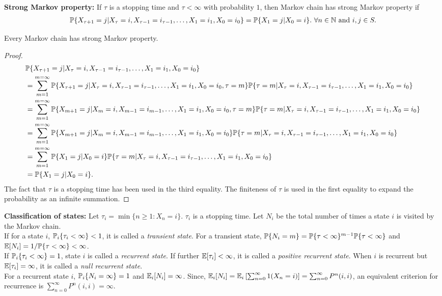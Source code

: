 \documentclass[all-lectures.tex]{subfiles}
\begin{document}
\indent \textbf{Strong Markov property:} If $\tau$ is a stopping time and $\tau < \infty$ with probability $1$, then Markov chain has strong Markov property if
\begin{align*}
\P\{X_{\tau+1} = j|X_{\tau} = i, X_{\tau-1} = i_{\tau-1},\dots,X_1 = i_1,X_0 = i_0\} = \P\{X_1 = j|X_{0} = i\}. \ \forall n \in \mathbb{N} \text{ and }i,j \in S.
\end{align*}
\begin{thm}
Every Markov chain has strong Markov property.
\begin{proof}
\begin{align*}
&\P\{X_{{\tau+1}} = j|X_{\tau} = i, X_{\tau-1} = i_{\tau-1},\dots,X_1 = i_1,X_0 = i_0\}  \\
&= \sum_{m = 1}^{m=\infty} \P\{X_{{\tau+1}} = j|X_{{\tau}} = i, X_{{\tau-1}} = i_{{\tau-1}},\dots,X_1 = i_1,X_0 = i_0,{\tau} = m\} \P\{{\tau} = m|X_{{\tau}} = i, X_{{\tau-1}} = i_{{\tau-1}},\dots,X_1 = i_1,X_0 = i_0\} \\
&= \sum_{m = 1}^{m=\infty} \P\{X_{m+1} = j|X_{m} = i, X_{m-1} = i_{m-1},\dots,X_1 = i_1,X_0 = i_0,{\tau} = m\} \P\{{\tau} = m|X_{{\tau}} = i, X_{{\tau-1}} = i_{{\tau-1}},\dots,X_1 = i_1,X_0 = i_0\} \\
&= \sum_{m = 1}^{m=\infty} \P\{X_{m+1} = j|X_{m} = i, X_{m-1} = i_{m-1},\dots,X_1 = i_1,X_0 = i_0\} \P\{{\tau} = m|X_{{\tau}} = i, X_{{\tau-1}} = i_{{\tau-1}},\dots,X_1 = i_1,X_0 = i_0\} \\
&= \sum_{m = 1}^{m=\infty} \P\{X_{1} = j|X_{0} = i\} \P\{{\tau} = m|X_{{\tau}} = i, X_{{\tau-1}} = i_{{\tau-1}},\dots,X_1 = i_1,X_0 = i_0\} \\
&= \P\{X_{1} = j|X_{0} = i\}.
\end{align*}
The fact that ${\tau}$ is a stopping time has been used in the third equality. The finiteness of $\tau$ is used in the first equality to expand the probability as an infinite summation.
\end{proof}
\end{thm}
\textbf{Classification of states:} Let $\tau_i = \min\{n \geq 1 : X_n = i\}$. $\tau_i$ is a stopping time. Let $N_i$ be the total number of times a state $i$ is visited by the Markov chain. \\
\indent If for a state $i$, $\P_i\{\tau_i < \infty\} < 1$, it is called a \textit{{transient state}}. For a transient state, $\P\{N_i = m \} = \\ \P\{\tau < \infty\}^{m-1}\P\{\tau < \infty\}$ and $\E[N_i] = 1/\P\{\tau < \infty\}< \infty$. \\
\indent If $\P_i\{\tau_i < \infty\} = 1$, state $i$ is called a \textit{{recurrent state}}. If further $\E[\tau_i] < \infty$, it is called a \textit{positive recurrent state}. When $i$ is recurrent but $\E[\tau_i] = \infty$, it is called a \textit{null recurrent state}. \\
\indent For a recurrent state $i$, $\P_i\{N_i = \infty\} = 1$ and $\E_i[N_i] = \infty$. Since, $\E_i[N_i] = \E_i\left[\sum_{n=0}^\infty 1(X_n = i)\right] = \sum_{n=0}^\infty P^n(i,i)$, an equivalent criterion for recurrence is $\sum_{n=0}^\infty P^n(i,i) = \infty$. \\
 
\end{document}
